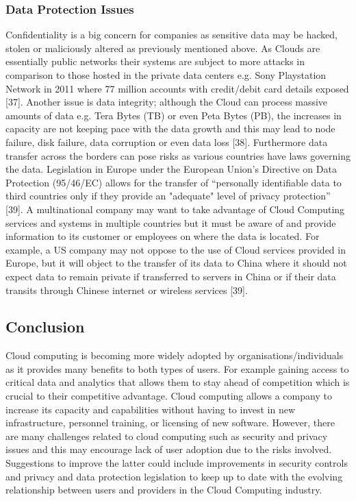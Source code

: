 \documentclass[10pt,journal,compsoc]{IEEEtran}
\begin{document}
\subsubsection{Data Protection Issues}
Confidentiality is a big concern for companies as sensitive data may be hacked, stolen or maliciously altered as previously mentioned above. As Clouds are essentially public networks their systems are subject to more attacks in comparison to those hosted in the private data centers e.g. Sony Playstation Network in 2011 where 77 million accounts with credit/debit card details exposed [37]. Another issue is data integrity; although the Cloud can process massive amounts of data e.g. Tera Bytes (TB) or even Peta Bytes (PB), the increases in  capacity are not keeping pace with the data growth and this may lead to node failure, disk failure, data corruption or even data loss [38]. Furthermore data transfer across the borders can pose risks as various countries have laws governing the data. Legislation in Europe under the European Union's Directive on Data Protection (95/46/EC) allows for the transfer of “personally identifiable data to third countries only if they provide an "adequate" level of privacy protection” [39]. A multinational company may want to take advantage of Cloud Computing services and systems in multiple countries but it must be aware of and provide information to its customer or employees on where the data is located. For example, a US company may not oppose to the use of Cloud services provided in Europe, but it will object to the transfer of its data to China where it should not expect data to remain private if transferred to servers in China or if their data transits through Chinese internet or wireless services [39].







\vspace{2mm}
\subsection{Conclusion}
Cloud computing is becoming more widely adopted by organisations/individuals as it provides many benefits to both types of users. For example gaining access to critical data and analytics that allows them to stay ahead of competition which is crucial to their competitive advantage. Cloud computing allows a company to increase its capacity and capabilities without having to invest in new infrastructure, personnel training, or licensing of new software. However, there are many challenges related to cloud computing such as security and privacy issues and this may encourage lack of user adoption due to the risks involved.  Suggestions to improve the latter could include improvements in security controls and privacy and data protection legislation to keep up to date with the evolving relationship between users and providers in the Cloud Computing industry. 
\end{document}
